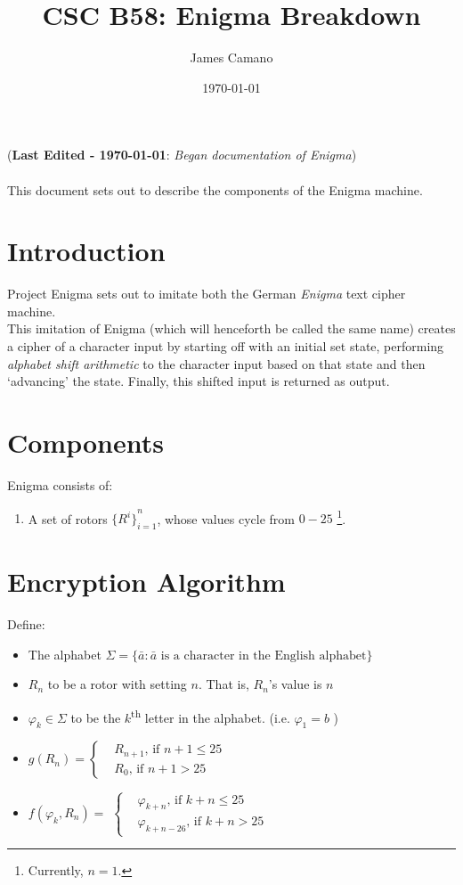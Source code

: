 \documentclass[12pt,a4paper]{article}
\title{CSC B58: Enigma Breakdown}
\date{\today}
\author{James Camano}
\newcommand{\lastedited}[1]{(\textbf{Last Edited - \today{}}: \emph{#1})}
\begin{document}
	\maketitle
	\lastedited{Began documentation of Enigma} \\ \\
	This document sets out to describe the components of the Enigma machine. \\
	\section{Introduction}
 	Project Enigma sets out to imitate both the German \emph{Enigma} text cipher machine.  \\

	This imitation of Enigma (which will henceforth be called the same name) creates a cipher of a character input by starting off with an initial set state, performing \emph{alphabet shift arithmetic} to the character input based on that state and then `advancing' the state. Finally, this shifted input is returned as output.
	
	\section{Components}
	Enigma consists of:

	\begin{enumerate}
		\item A set of rotors ${\{R^i\}}_{i=1}^{n}$, whose values cycle from $0-25$ \footnote{Currently, $n=1$. }. 
	\end{enumerate}

	\section{Encryption Algorithm}
	Define:
		\begin{itemize}
			\item The alphabet $\Sigma = \{\bar{a}: \bar{a} \text{ is a character in the English alphabet} \}$
			\item $R_n$ to be a rotor with setting $n$. That is, $R_n$'s value is $n$
			\item $\varphi_k \in \Sigma$ to be the $k$\textsuperscript{th} letter in the alphabet. (i.e. $\varphi_1 = b$ )

			\item $g(R_n) = \begin{cases}
					& R_{n+1} \text{, if } {n+1} \leq 25 \\
				      & R_0 \text{, if }{n+1} > 25
				  \end{cases} $
   
			
			\item $f(\varphi_k, R_n) =$ 
					$ 
					\begin{cases} 
						&\varphi_{k+n} \text{, if } {k+n} \leq 25 \\
						&\varphi_{k+n-26} \text{, if }{k+n} > 25
					\end{cases}
					$ 
		\end{itemize}
	
\end{document}
